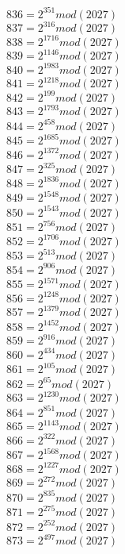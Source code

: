\documentclass[12pt, letterpaper]{article}
\begin{document}
\begin{itemize}
\begin{multicols}{3}
$836= 2^{351} mod (2027)$\\
$837= 2^{316} mod (2027)$\\
$838= 2^{1716} mod (2027)$\\
$839= 2^{1146} mod (2027)$\\
$840= 2^{1983} mod (2027)$\\
$841= 2^{1218} mod (2027)$\\
$842= 2^{199} mod (2027)$\\
$843= 2^{1793} mod (2027)$\\
$844= 2^{458} mod (2027)$\\
$845= 2^{1685} mod (2027)$\\
$846= 2^{1372} mod (2027)$\\
$847= 2^{325} mod (2027)$\\
$848= 2^{1836} mod (2027)$\\
$849= 2^{1548} mod (2027)$\\
$850= 2^{1543} mod (2027)$\\
$851= 2^{756} mod (2027)$\\
$852= 2^{1706} mod (2027)$\\
$853= 2^{513} mod (2027)$\\
$854= 2^{906} mod (2027)$\\
$855= 2^{1571} mod (2027)$\\
$856= 2^{1248} mod (2027)$\\
$857= 2^{1379} mod (2027)$\\
$858= 2^{1452} mod (2027)$\\
$859= 2^{916} mod (2027)$\\
$860= 2^{434} mod (2027)$\\
$861= 2^{105} mod (2027)$\\
$862= 2^{65} mod (2027)$\\
$863= 2^{1230} mod (2027)$\\
$864= 2^{851} mod (2027)$\\
$865= 2^{1143} mod (2027)$\\
$866= 2^{322} mod (2027)$\\
$867= 2^{1568} mod (2027)$\\
$868= 2^{1227} mod (2027)$\\
$869= 2^{272} mod (2027)$\\
$870= 2^{835} mod (2027)$\\
$871= 2^{275} mod (2027)$\\
$872= 2^{252} mod (2027)$\\
$873= 2^{497} mod (2027)$\\

\end{multicols}
\end{itemize}
\end{document}
